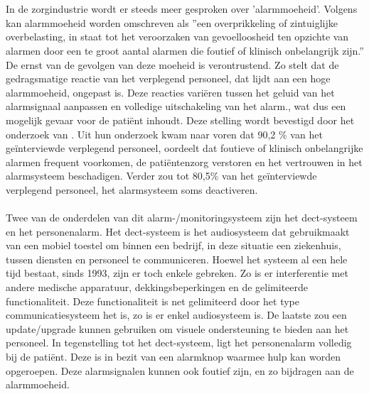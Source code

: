 
\chapter{}%
\label{ch:inleiding}


\section{}%
\label{sec:probleemstelling}

In de zorgindustrie wordt er steeds meer gesproken over 'alarmmoeheid'. Volgens \textcite{Ferrara2023} kan alarmmoeheid worden omschreven als ''een overprikkeling of zintuiglijke overbelasting, in staat tot het veroorzaken van gevoelloosheid ten opzichte van alarmen door een te groot aantal alarmen die foutief of klinisch onbelangrijk zijn.'' De ernst van de gevolgen van deze moeheid is verontrustend. Zo stelt \textcite{Ferrara2023} dat de gedragsmatige reactie van het verplegend personeel, dat lijdt aan een hoge alarmmoeheid, ongepast is. Deze reacties variëren tussen het geluid van het alarmsignaal aanpassen en volledige uitschakeling van het alarm., wat dus een mogelijk gevaar voor de patiënt inhoudt. Deze stelling wordt bevestigd door het onderzoek van \textcite{Casey2018}. Uit hun onderzoek kwam naar voren dat 90,2 \% van het geïnterviewde verplegend personeel, oordeelt dat foutieve of klinisch onbelangrijke alarmen frequent voorkomen, de patiëntenzorg verstoren en het vertrouwen in het alarmsysteem beschadigen. Verder zou tot 80,5\% van het geïnterviewde verplegend personeel, het alarmsysteem soms deactiveren.
\\\\
Twee van de onderdelen van dit alarm-/monitoringsysteem zijn het \gls{dect}-systeem en het personenalarm. Het \gls{dect}-systeem is het audiosysteem dat gebruikmaakt van een mobiel toestel om binnen een bedrijf, in deze situatie een ziekenhuis, tussen diensten en personeel te communiceren. Hoewel het systeem al een hele tijd bestaat, sinds 1993, zijn er toch enkele gebreken. Zo is er interferentie met andere medische apparatuur, dekkingsbeperkingen en de gelimiteerde functionaliteit. Deze functionaliteit is net gelimiteerd door het type communicatiesysteem het is, zo is er enkel audiosysteem is. De laatste zou een update/upgrade kunnen gebruiken om visuele ondersteuning te bieden aan het personeel.
In tegenstelling tot het \gls{dect}-systeem, ligt het personenalarm volledig bij de patiënt. Deze is in bezit van een alarmknop waarmee hulp kan worden opgeroepen. Deze alarmsignalen kunnen ook foutief zijn, en zo bijdragen aan de alarmmoeheid.\\


